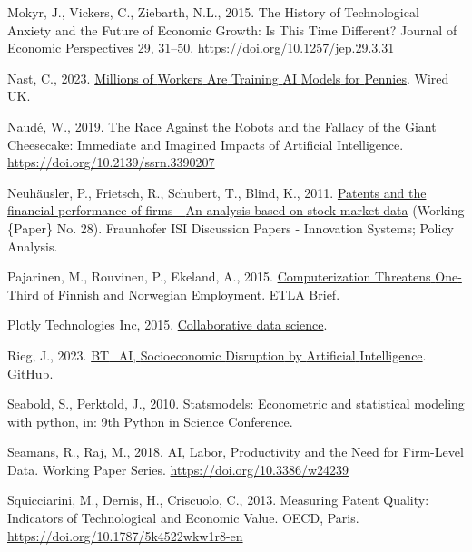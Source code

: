 \documentclass[
  12pt,
  a4paperpaper,
]{article}
\newlength{\cslhangindent}
\newenvironment{CSLReferences}[2] %
 {\begin{list}{}{%
  \setlength{\itemindent}{0pt}
  \setlength{\leftmargin}{0pt}
  \setlength{\parsep}{0pt}
  \ifodd #1
   \setlength{\leftmargin}{\cslhangindent}
   \setlength{\itemindent}{-1\cslhangindent}
  \fi
  \setlength{\itemsep}{#2\baselineskip}}}
 {\end{list}}
\begin{document}
\begin{CSLReferences}{1}{0}
Mokyr, J., Vickers, C., Ziebarth, N.L., 2015. The {History} of
{Technological} {Anxiety} and the {Future} of {Economic} {Growth}: {Is}
{This} {Time} {Different}? Journal of Economic Perspectives 29, 31--50.
\url{https://doi.org/10.1257/jep.29.3.31}

Nast, C., 2023.
\href{https://www.wired.co.uk/article/low-paid-workers-are-training-ai-models-for-tech-giants}{Millions
of {Workers} {Are} {Training} {AI} {Models} for {Pennies}}. Wired UK.

Naudé, W., 2019. The {Race} {Against} the {Robots} and the {Fallacy} of
the {Giant} {Cheesecake}: {Immediate} and {Imagined} {Impacts} of
{Artificial} {Intelligence}. \url{https://doi.org/10.2139/ssrn.3390207}

Neuhäusler, P., Frietsch, R., Schubert, T., Blind, K., 2011.
\href{https://www.econstor.eu/handle/10419/44995}{Patents and the
financial performance of firms - {An} analysis based on stock market
data} (Working \{Paper\} No. 28). Fraunhofer ISI Discussion Papers -
Innovation Systems; Policy Analysis.

Pajarinen, M., Rouvinen, P., Ekeland, A., 2015.
\href{https://ideas.repec.org//p/rif/briefs/34.html}{Computerization
{Threatens} {One}-{Third} of {Finnish} and {Norwegian} {Employment}}.
ETLA Brief.

Plotly Technologies Inc, 2015. \href{https://plot.ly}{Collaborative data
science}.

Rieg, J., 2023. \href{https://github.com/Jonasrg/BT_AI}{{BT}\_AI,
{Socioeconomic} {Disruption} by {Artificial} {Intelligence}}. GitHub.

Seabold, S., Perktold, J., 2010. Statsmodels: {Econometric} and
statistical modeling with python, in: 9th {Python} in {Science}
{Conference}.

Seamans, R., Raj, M., 2018. {AI}, {Labor}, {Productivity} and the {Need}
for {Firm}-{Level} {Data}. Working {Paper} {Series}.
\url{https://doi.org/10.3386/w24239}

Squicciarini, M., Dernis, H., Criscuolo, C., 2013. Measuring {Patent}
{Quality}: {Indicators} of {Technological} and {Economic} {Value}. OECD,
Paris. \url{https://doi.org/10.1787/5k4522wkw1r8-en}


\end{CSLReferences}
\end{document}
